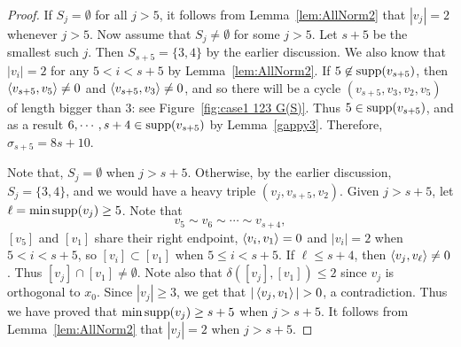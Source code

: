 \begin{proof}
If $S_j=\emptyset$ for all $j>5$, it follows from Lemma~\ref{lem:AllNorm2} that $|v_j|=2$ whenever $j>5$. Now assume that $S_j\ne\emptyset$ for some $j>5$.
Let $s+5$ be the smallest such $j$. Then $S_{s+5}=\{3,4\}$ by the earlier discussion. We also know that $|v_i|=2$ for any $5<i<s+5$ by Lemma~\ref{lem:AllNorm2}. If $5\not \in \operatorname{supp}(v_{s+5})$, then $\left\langle v_{s+5} , v_5 \right\rangle\neq 0$ and $\left\langle v_{s+5} , v_3 \right\rangle\neq 0$, and so there will be a cycle $(v_{s+5}, v_3, v_2, v_5)$ of length bigger than $3$: see Figure~\ref{fig:case1 123 G(S)}. Thus $5 \in \operatorname{supp}(v_{s+5})$, and as a result $6, \cdots, s+4\in \operatorname{supp}(v_{s+5})$ by Lemma~\ref{gappy3}. Therefore, $\sigma_{s+5}=8s+10$.

Note that, $S_j=\emptyset$ when $j>s+5$. Otherwise, by the earlier discussion, $S_j=\{3,4\}$, and
we would have a heavy triple $(v_{j}, v_{s+5}, v_2)$. 
Given $j>s+5$, let $\ell=\min\operatorname{supp}(v_j)\ge5$. Note that
\[
v_5\sim v_6\sim \cdots \sim v_{s+4},
\]
$[v_5]$ and $[v_1]$ share their right endpoint, $\left\langle v_i , v_1 \right\rangle=0$ and $|v_i|=2$ when $5<i<s+5$, so $[v_{i}]\subset [v_1]$ when $5\le i<s+5$. If $\ell\le s+4$, then $\left\langle v_j , v_{\ell} \right\rangle\ne0$.
Thus $[v_{j}]\cap [v_1]\neq \emptyset$. Note also that $\delta([v_{j}], [v_1])\le 2$ since $v_{j}$ is orthogonal to $x_0$. Since $|v_{j}|\ge 3$, we get that $|\braket{v_{j}}{v_1}|>0$, a contradiction. Thus we have proved that $\min\operatorname{supp}(v_j)\ge s+5$ when $j>s+5$. It follows from Lemma~\ref{lem:AllNorm2} that $|v_j|=2$ when $j>s+5$.


\end{proof}
